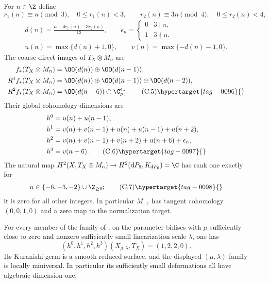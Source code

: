 \begin{proposition}\hypertarget{tag-01FS}{}\label{cdp:st:C5b}


For $n\in\Z$ define
\[
 r_1(n)\equiv n\pmod3,\quad 0\le r_1(n)<3,
 \qquad r_2(n)\equiv3n\pmod4,\quad0\le r_2(n)<4,
\]
\begin{gather*}
 d(n)=\frac{n-4r_1(n)-3r_2(n)}{12},\qquad
 \epsilon_n=\begin{cases}0&3\mid n,\\1&3\nmid n.\end{cases}
\\
 u(n)=\max\{d(n)+1,0\},\qquad
 v(n)=\max\{-d(n)-1,0\}.
\end{gather*}
The coarse direct images of $T_X\otimes M_n$ are
\begin{align*}
 f_*(T_X\otimes M_n)&=\OO(d(n))\oplus\OO(d(n-1)),\\
 R^1f_*(T_X\otimes M_n)&=\OO(d(n))\oplus\OO(d(n-1))\oplus\OO(d(n+2)),\\
 R^2f_*(T_X\otimes M_n)&=\OO(d(n+6))\oplus\C_{p_1}^{\epsilon_n}.\tag{C.5}\hypertarget{tag-0096}{}\label{cdp:eq:C.5}
\end{align*}
Their global cohomology dimensions are
\begin{align*}
 h^0&=u(n)+u(n-1),\\
 h^1&=v(n)+v(n-1)+u(n)+u(n-1)+u(n+2),\\
 h^2&=v(n)+v(n-1)+v(n+2)+u(n+6)+\epsilon_n,\\
 h^3&=v(n+6).                                             \tag{C.6}\hypertarget{tag-0097}{}\label{cdp:eq:C.6}
\end{align*}
The natural map $H^2(X,T_X\otimes M_n)\to H^2(\mathrm dP_6,K_{\mathrm dP_6})=\C$ has rank one exactly for
\[
 n\in\{-6,-3,-2\}\cup\Z_{\ge0};                         \tag{C.7}\hypertarget{tag-0098}{}\label{cdp:eq:C.7}
\]
it is zero for all other integers. In particular $M_{-1}$ has tangent cohomology $(0,0,1,0)$ and a zero map to the normalization target.
\end{proposition}

\begin{proposition}\hypertarget{tag-01GK}{}\label{cdp:st:E13}


For every member of the family of
\cite[Proposition labelled \texttt{family}]{Viaclovsky2026Two}, on the parameter
bidiscs with $\mu$ sufficiently close to zero and nonzero sufficiently
small linearization scale $\lambda$, one has
\[
 (h^0,h^1,h^2,h^3)(X_{\mu,\lambda},T_X)=(1,2,2,0).
\]
Its Kuranishi germ is a smooth reduced surface, and the displayed
$(\mu,\lambda)$-family is locally miniversal. In particular its
sufficiently small deformations all have algebraic dimension one.
\end{proposition}


